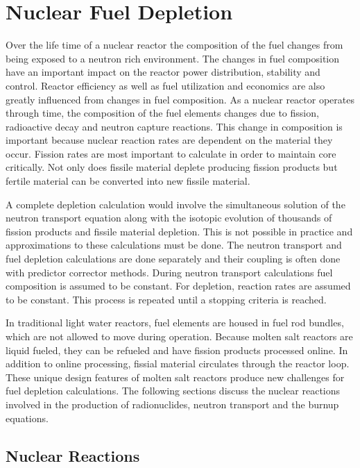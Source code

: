 \chapter{Nuclear Fuel Depletion} \label{ch:burnupEquations}
Over the life time of a nuclear reactor the composition of the fuel changes from being exposed to a neutron rich environment. The changes in fuel composition have an important impact on the reactor power distribution, stability and control. Reactor efficiency as well as fuel utilization and economics are also greatly influenced from changes in fuel composition. As a nuclear reactor operates through time, the composition of the fuel elements changes due to fission, radioactive decay and neutron capture reactions. This change in composition is important because nuclear reaction rates are dependent on the material they occur. Fission rates are most important to calculate in order to maintain core critically. Not only does fissile material deplete producing fission products but fertile material can be converted into new fissile material. 

A complete depletion calculation would involve the simultaneous solution of the neutron transport equation along with the isotopic evolution of thousands of fission products and fissile material depletion. This is not possible in practice and approximations to these calculations must be done. The neutron transport and fuel depletion calculations are done separately and their coupling is often done with predictor corrector methods. During neutron transport calculations fuel composition is assumed to be constant. For depletion, reaction rates are assumed to be constant. This process is repeated until a stopping criteria is reached. 

In traditional light water reactors, fuel elements are housed in fuel rod bundles, which are not allowed to move during operation. Because molten salt reactors are liquid fueled, they can be refueled and have fission products processed online. In addition to online processing, fissial material circulates through the reactor loop. These unique design features of molten salt reactors produce new challenges for fuel depletion calculations. The following sections discuss the nuclear reactions involved in the production of radionuclides, neutron transport and the burnup equations.

\section{Nuclear Reactions}

